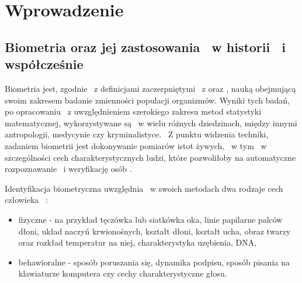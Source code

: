 \chapter{Wprowadzenie}
\label{cha:wprowadzenie}


\section{Biometria oraz jej zastosowania ~w historii ~i współcześnie}
\label{sec:biometria}

Biometria jest, zgodnie ~z definicjami zaczerpniętymi ~z \cite{Ko75} oraz \cite{Bio01}, nauką obejmującą swoim zakresem badanie zmienności populacji organizmów. Wyniki tych badań, po opracowaniu ~z uwzględnieniem szerokiego zakresu metod statystyki matematycznej, wykorzystywane są ~w wielu różnych dziedzinach, między innymi antropologii, medycynie czy kryminalistyce. ~Z punktu widzenia techniki, zadaniem biometrii jest dokonywanie pomiarów istot żywych, ~w tym ~w szczególności cech charakterystycznych ludzi, które pozwoliłoby na automatyczne rozpoznawanie ~i weryfikację osób \cite{Bio01}\cite{Jain00}.

Identyfikacja biometryczna uwzględnia ~w swoich metodach dwa rodzaje cech człowieka ~\cite{Bio01}\cite{Bio02}\cite{Jain00}\cite{Jain08}:
\begin{itemize} 
\item fizyczne - na przykład tęczówka lub siatkówka oka, linie papilarne palców dłoni, układ naczyń krwionośnych, kształt dłoni, kształt ucha, obraz twarzy oraz rozkład temperatur na niej, charakterystyka uzębienia, DNA, 
\item behawioralne - sposób poruszania się, dynamika podpisu, sposób pisania na klawiaturze komputera czy cechy charakterystyczne głosu.
\end{itemize}


